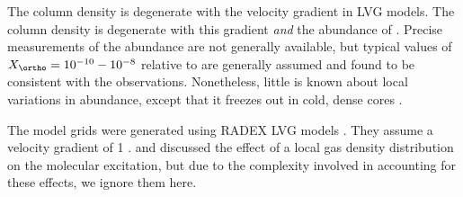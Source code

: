 The \ortho column density is degenerate with the velocity gradient in LVG
models.  The \hh column density is degenerate with this gradient \emph{and} the
abundance of \ortho.  Precise measurements of the \formaldehyde abundance are
not generally available, but typical values of $X_{\ortho} = 10^{-10}-10^{-8}$
relative to \hh are generally assumed \citep{Mangum1993a, Ginsburg2011a,
Ginsburg2013a, Ao2013a} and found to be consistent with the observations.
Nonetheless, little is known about local variations in \ortho abundance, except
that it freezes out in cold, dense cores \citep{Young2004a}.


The model grids were generated using RADEX LVG models
\citep[python wrapper \url{https://github.com/keflavich/pyradex/}; original
code][]{van-Der-Tak2007a}.  They assume a velocity gradient of 1 \kms \perpc.
\citet{Ginsburg2011a} and \citet{Ginsburg2013a} discussed the effect of a local
gas density distribution on the molecular excitation, but due to the complexity
involved in accounting for these effects, we ignore them here.



